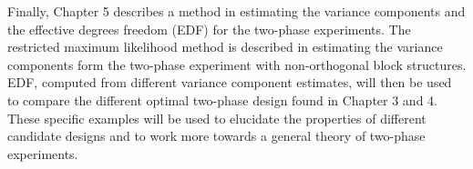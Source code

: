 \documentclass[11pt,a4paper]{article}
\begin{document}
Finally, Chapter 5 describes a method in estimating the variance components and the effective degrees freedom (EDF) for the two-phase experiments. The restricted maximum likelihood method is described in estimating the variance components form the two-phase experiment with non-orthogonal block structures. EDF, computed from different variance component estimates, will then be used to compare the different optimal two-phase design found in Chapter 3 and 4. These specific examples will be used to elucidate the properties of different candidate designs and to work more towards a general theory of two-phase experiments.  




\end{document}
